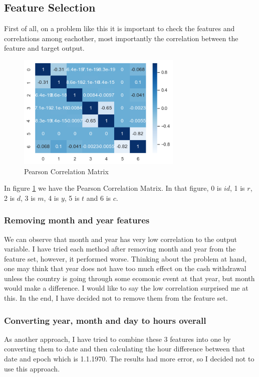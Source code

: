 \documentclass[11pt,reqno]{amsart}
\begin{document}
\subsection{Feature Selection}
First of all, on a problem like this it is important to check the features and correlations among eachother, most importantly the correlation between the feature and target output.
\begin{figure}[h]
	\centering
	\caption{Pearson Correlation Matrix}
	\label{cor}
	\begin{centering}
		\includegraphics[width=0.7\textwidth]{cor.png}
	\end{centering}
\end{figure}
In figure \ref{cor} we have the Pearson Correlation Matrix. In that figure, 0 is $id$, 1 is $r$, 2 is $d$, 3 is $m$, 4 is $y$, 5 is $t$ and 6 is $c$. 
\subsubsection{Removing month and year features}
We can observe that month and year has very low correlation to the output variable. I have tried each method after removing month and year from the feature set, however, it performed worse. Thinking about the problem at hand, one may think that year does not have too much effect on the cash withdrawal unless the country is going through some ecomonic event at that year, but month would make a difference. I would like to say the low correlation surprised me at this. In the end, I have decided not to remove them from the feature set.
\subsubsection{Converting year, month and day to hours overall}
As another approach, I have tried to combine these 3 features into one by converting them to date and then calculating the hour difference between that date and epoch which is 1.1.1970. The results had more error, so I decided not to use this approach.
\end{document}
